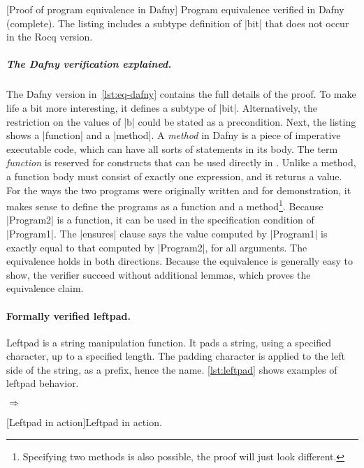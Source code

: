 \begin{center}
\begin{minipage}{\textwidth}
\captionsetup{type=lstlisting}
[Proof of program equivalence in Dafny]{
Program equivalence verified in Dafny (complete).
The listing includes a subtype definition of \pr|bit| that does not occur in the Rocq version.}
\label{lst:eq-dafny}
\end{minipage}
\end{center}

\subparagraph*{The Dafny verification explained.}
The Dafny version in~\autoref{lst:eq-dafny} contains the full details of the proof.
To make life a bit more interesting, it defines a subtype of \pr|bit|.
Alternatively, the restriction on the values of \pr|b| could be stated as a precondition.
Next, the listing shows a \pr|function| and a \pr|method|.
A \emph{method} in Dafny is a piece of imperative executable code, which can have all sorts of statements in its body.
The term \emph{function} is reserved for constructs that can be used directly in .
Unlike a method, a function body must consist of exactly one expression, and it returns a value.
For the ways the two programs were originally written and for demonstration,
it makes sense to define the programs as a function and a method\footnote{
Specifying two methods is also possible, the proof will just look different.}.
Because \pr|Program2| is a function, it can be used in the specification condition of \pr|Program1|.
The \pr|ensures| clause says the value computed by \pr|Program1| is exactly equal to that
computed by \pr|Program2|, for all arguments.
The equivalence holds in both directions.
Because the equivalence is generally easy to show, the verifier succeed without additional lemmas,
which proves the equivalence claim.

\paragraph{Formally verified leftpad.}
Leftpad is a string manipulation function.
It pads a string, using a specified character, up to a specified length.
The padding character is applied to the left side of the string, as a prefix, hence the name.
\autoref{lst:leftpad} shows examples of leftpad behavior.

\begin{center}
\captionsetup{type=lstlisting}
\begin{minipage}{\textwidth}
\begin{minipage}{.45\textwidth}
\end{minipage}%
\hfill\(\Rightarrow\)\hfill%
\begin{minipage}{.45\textwidth}
\end{minipage}
\end{minipage}
[Leftpad in action]{Leftpad in action.}
\label{lst:leftpad}
\end{center}

